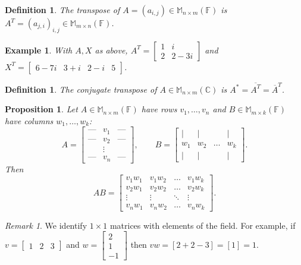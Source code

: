 \documentclass[12pt]{article}
\theoremstyle{breakplain}
\newtheorem{prop}[theorem]{Proposition}
\theoremstyle{breakdef}
\newtheorem{definition}[theorem]{Definition}
\newtheorem*{example}{Example}
\theoremstyle{remark}
\newtheorem*{remark}{Remark}
\begin{document}
\begin{definition}
    The \emph{transpose} of $A=(a_{i,j})\in\mathbb{M}_{n\times m}(\mathbb{F})$ is $A^T=(a_{j,i})_{i,j}\in\mathbb{M}_{m\times n}(\mathbb{F})$.
\end{definition}
\begin{example}
    With $A,X$ as above, $A^T=\begin{bmatrix}
        1 & i \\
        2 & 2-3i
    \end{bmatrix}$ and $X^T=\begin{bmatrix}
        6-7i & 3+i & 2-i & 5
    \end{bmatrix}$.
\end{example}
\begin{definition}
    The \emph{conjugate transpose} of $A\in\mathbb{M}_{n\times m}(\mathbb{C})$ is $A^*=\overline{A^T}=\overline{A}^T$.
\end{definition}
\begin{prop}
    Let $A\in \mathbb{M}_{n\times m}(\mathbb{F})$ have rows $v_1,\ldots,v_n$ and $B \in  \mathbb{M}_{m\times k}(\mathbb{F})$ have columns $w_1,\ldots,w_k$:
    \[A = \begin{bmatrix}
    \text{---} & v_1 & \text{---} \\
    \text{---} & v_2 & \text{---} \\
    & \vdots & \\
    \text{---} & v_n & \text{---}
    \end{bmatrix}, \qquad
    B = \begin{bmatrix}
    \mid & \mid & & \mid \\
    w_1 & w_2 & \dots & w_k \\
    \mid & \mid & & \mid
    \end{bmatrix}.\]
    Then
    \[AB = \begin{bmatrix}
    v_1 w_1 & v_1 w_2 & \dots & v_1 w_k \\
    v_2 w_1 & v_2 w_2 & \dots & v_2 w_k \\
    \vdots & \vdots & \ddots & \vdots \\
    v_n w_1 & v_n w_2 & \dots & v_n w_k
    \end{bmatrix}.\]
\end{prop}
\begin{remark}
    We identify $1\times 1$ matrices with elements of the field. For example, if $v=\begin{bmatrix}
       1& 2 & 3
   \end{bmatrix} $ and $w=\begin{bmatrix}
       2 \\1 \\-1
   \end{bmatrix}$ then $vw=[2+2-3]=[1]= 1$.
\end{remark}
\end{document}
